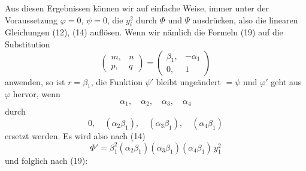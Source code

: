 Aus diesen Ergebnissen können wir auf einfache Weise, immer unter der
Voraussetzung $\varphi = 0$, $\psi = 0$, die $y_i^2$ durch $\Phi$ und
$\Psi$ ausdrücken, also die linearen Gleichungen (12), (14) auflösen.
Wenn wir nämlich die Formeln (19) auf die Substitution
\[
\begin{pmatrix} m, & n\\ p, & q \end{pmatrix} = \begin{pmatrix} \beta_1, & -\alpha_1\\ 0, & 1 \end{pmatrix}
\]
anwenden, so ist $r = \beta_1$, die Funktion $\psi'$ bleibt
ungeändert $= \psi$ und $\varphi'$ geht aus $\varphi$ hervor, wenn
\[
\alpha_1,\quad \alpha_2,\quad \alpha_3,\quad \alpha_4
\]
durch
\[
0,\quad (\alpha_2\beta_1),\quad (\alpha_3\beta_1),\quad (\alpha_4\beta_1)
\]
ersetzt werden. Es wird also nach (14)
\[
\Phi' = \beta_1^2(\alpha_2\beta_1)(\alpha_3\beta_1)(\alpha_4\beta_1)\,y_1^2
\]
und folglich nach (19):
